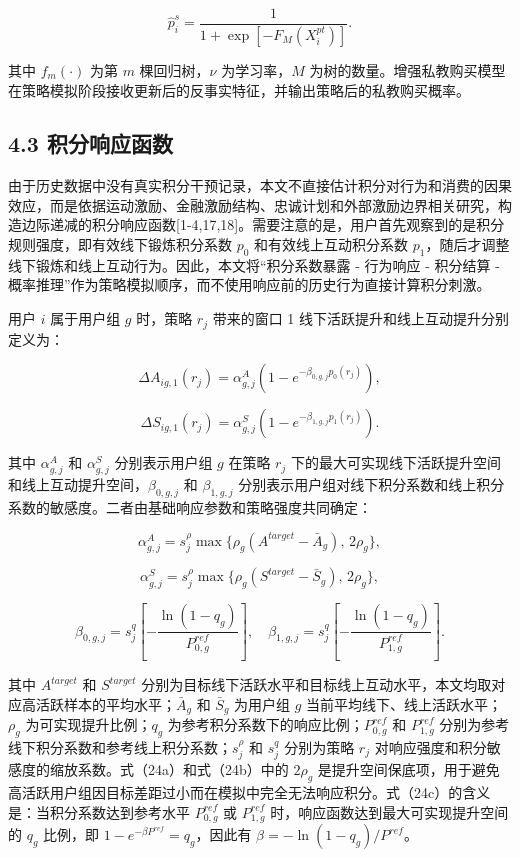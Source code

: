 \documentclass[
  12pt,
]{ctexart}
\begin{document}
\[
\hat p_i^{s}=\frac{1}{1+\exp[-F_M(X_i^{pt})]}.
\tag{22}
\]

其中 \(f_m(\cdot)\) 为第 \(m\) 棵回归树，\(\nu\) 为学习率，\(M\) 为树的数量。增强私教购买模型在策略模拟阶段接收更新后的反事实特征，并输出策略后的私教购买概率。

\hypertarget{ux79efux5206ux54cdux5e94ux51fdux6570}{%
\subsection{4.3 积分响应函数}\label{ux79efux5206ux54cdux5e94ux51fdux6570}}

由于历史数据中没有真实积分干预记录，本文不直接估计积分对行为和消费的因果效应，而是依据运动激励、金融激励结构、忠诚计划和外部激励边界相关研究，构造边际递减的积分响应函数{[}1-4,17,18{]}。需要注意的是，用户首先观察到的是积分规则强度，即有效线下锻炼积分系数 \(p_0\) 和有效线上互动积分系数 \(p_1\)，随后才调整线下锻炼和线上互动行为。因此，本文将``积分系数暴露 - 行为响应 - 积分结算 - 概率推理''作为策略模拟顺序，而不使用响应前的历史行为直接计算积分刺激。

用户 \(i\) 属于用户组 \(g\) 时，策略 \(r_j\) 带来的窗口 1 线下活跃提升和线上互动提升分别定义为：

\[
\Delta A_{ig,1}(r_j)=\alpha_{g,j}^{A}\left(1-e^{-\beta_{0,g,j}p_0(r_j)}\right),
\tag{23}
\]

\[
\Delta S_{ig,1}(r_j)=\alpha_{g,j}^{S}\left(1-e^{-\beta_{1,g,j}p_1(r_j)}\right).
\tag{23'}
\]

其中 \(\alpha_{g,j}^{A}\) 和 \(\alpha_{g,j}^{S}\) 分别表示用户组 \(g\) 在策略 \(r_j\) 下的最大可实现线下活跃提升空间和线上互动提升空间，\(\beta_{0,g,j}\) 和 \(\beta_{1,g,j}\) 分别表示用户组对线下积分系数和线上积分系数的敏感度。二者由基础响应参数和策略强度共同确定：

\[
\alpha_{g,j}^{A}=s_j^\rho\max\{\rho_g(A^{target}-\bar A_g),\,2\rho_g\},
\tag{24a}
\]

\[
\alpha_{g,j}^{S}=s_j^\rho\max\{\rho_g(S^{target}-\bar S_g),\,2\rho_g\},
\tag{24b}
\]

\[
\beta_{0,g,j}=s_j^q\left[-\frac{\ln(1-q_g)}{P_{0,g}^{ref}}\right],\quad
\beta_{1,g,j}=s_j^q\left[-\frac{\ln(1-q_g)}{P_{1,g}^{ref}}\right].
\tag{24c}
\]

其中 \(A^{target}\) 和 \(S^{target}\) 分别为目标线下活跃水平和目标线上互动水平，本文均取对应高活跃样本的平均水平；\(\bar A_g\) 和 \(\bar S_g\) 为用户组 \(g\) 当前平均线下、线上活跃水平；\(\rho_g\) 为可实现提升比例；\(q_g\) 为参考积分系数下的响应比例；\(P_{0,g}^{ref}\) 和 \(P_{1,g}^{ref}\) 分别为参考线下积分系数和参考线上积分系数；\(s_j^\rho\) 和 \(s_j^q\) 分别为策略 \(r_j\) 对响应强度和积分敏感度的缩放系数。式（24a）和式（24b）中的 \(2\rho_g\) 是提升空间保底项，用于避免高活跃用户组因目标差距过小而在模拟中完全无法响应积分。式（24c）的含义是：当积分系数达到参考水平 \(P_{0,g}^{ref}\) 或 \(P_{1,g}^{ref}\) 时，响应函数达到最大可实现提升空间的 \(q_g\) 比例，即 \(1-e^{-\beta P^{ref}}=q_g\)，因此有 \(\beta=-\ln(1-q_g)/P^{ref}\)。
\end{document}
